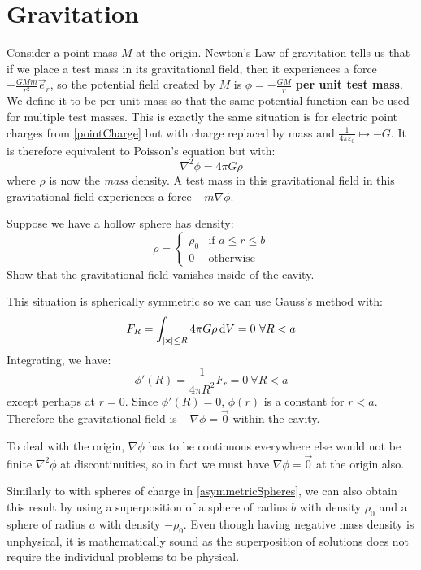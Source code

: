 \documentclass[../main.tex]{subfiles}
\begin{document}
\section{Gravitation}
Consider a point mass $M$ at the origin.
Newton's Law of gravitation tells us that if we place a test mass in its gravitational field, then it experiences a force $-\frac{GMm}{r^2}\vec{e}_r$, so the potential field created by $M$ is $\phi = - \frac{GM}{r}$ \textbf{per unit test mass}.
We define it to be per unit mass so that the same potential function can be used for multiple test masses.
This is exactly the same situation is for electric point charges from \cref{pointCharge} but with charge replaced by mass and $\frac{1}{4\pi\varepsilon_0} \mapsto -G$.
It is therefore equivalent to Poisson's equation but with:
\[
  \nabla^2 \phi = 4\pi G \rho
\]
where $\rho$ is now the \textit{mass} density.
A test mass in this gravitational field in this gravitational field experiences a force $-m \nabla\phi$.
\begin{example}
  Suppose we have a hollow sphere has density:
  \[
    \rho = \begin{cases}
    \rho_0 & \text{if } a \leq r \leq b \\
    0 & \text{otherwise}
    \end{cases}
  \]
  Show that the gravitational field vanishes inside of the cavity.

  This situation is spherically symmetric so we can use Gauss's method with:
  \[
    F_R = \int_{|\vec{x}|\leq R} 4\pi G\rho \d{V} = 0\ \forall R < a
  \]
  Integrating, we have:
  \[
    \phi'(R) = \frac{1}{4\pi R^2}F_r = 0\ \forall R < a
  \]
  except perhaps at $r = 0$.
  Since $\phi'(R) = 0$, $\phi(r)$ is a constant for $r < a$.
  Therefore the gravitational field is $-\nabla \phi = \vec{0}$ within the cavity.

  To deal with the origin, $\nabla \phi$ has to be continuous everywhere else would not be finite $\nabla^2 \phi$ at discontinuities, so in fact we must have $\nabla \phi = \vec{0}$ at the origin also.
\end{example}
\begin{remark}
  Similarly to with spheres of charge in \cref{asymmetricSpheres}, we can also obtain this result by using a superposition of a sphere of radius $b$ with density $\rho_0$ and a sphere of radius $a$ with density $-\rho_0$.
  Even though having negative mass density is unphysical, it is mathematically sound as the superposition of solutions does not require the individual problems to be physical.
\end{remark}
\end{document}
